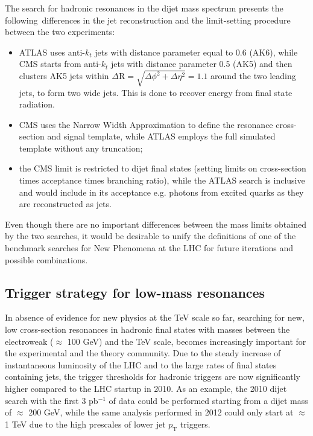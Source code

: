 \documentclass{PoS}
\newcommand{\antikt}{anti-$k_t$}
\begin{document}
The search for hadronic resonances in the dijet mass spectrum presents 
the following~differences in the jet reconstruction and the 
limit-setting procedure between the two experiments:
\begin{itemize}
\item ATLAS uses \antikt{} jets with distance parameter equal to 0.6 (AK6), while 
CMS starts from  \antikt{} jets with distance parameter 0.5
(AK5) and then clusters AK5 jets within $\Delta\mbox{R}=\sqrt{\Delta\phi^2+\Delta\eta^2}=1.1$ around the 
two leading jets, to form two wide jets. This is done to recover energy from final 
state radiation.
 \item CMS uses the Narrow Width Approximation to define the resonance cross-section and signal template, 
while ATLAS employs the full simulated template without any truncation;
 \item the CMS limit is restricted to dijet final states (setting limits 
on cross-section times acceptance times branching ratio), while the ATLAS search is 
inclusive and would include in its acceptance e.g. photons from excited quarks 
as they are reconstructed as jets. 
\end{itemize}
Even though there are no important differences between the mass limits obtained by the two searches, 
it would be desirable to unify the definitions of one of the benchmark searches for New Phenomena at the LHC
for future iterations and possible combinations. 

\subsection{Trigger strategy for low-mass resonances}
In absence of evidence for new physics at the TeV scale so far, 
searching for new, low cross-section resonances in hadronic final states with masses 
between the electroweak ($\approx$ 100 GeV) and the TeV scale, 
becomes increasingly important for the experimental and the theory community.
Due to the steady increase of instantaneous luminosity of the LHC and to 
the large rates of final states containing jets, 
the trigger thresholds for hadronic triggers are now significantly 
higher compared to the LHC startup in 2010. As an example, the 2010 
dijet search with the first 3 pb$^{-1}$ of data could be performed 
starting from a dijet mass of $\approx$ 200 GeV, 
while the same analysis performed in 2012 
could only start at $\approx$ 1 TeV due to the high 
prescales of lower jet $p_\mathrm{T}$ triggers.
\end{document}

